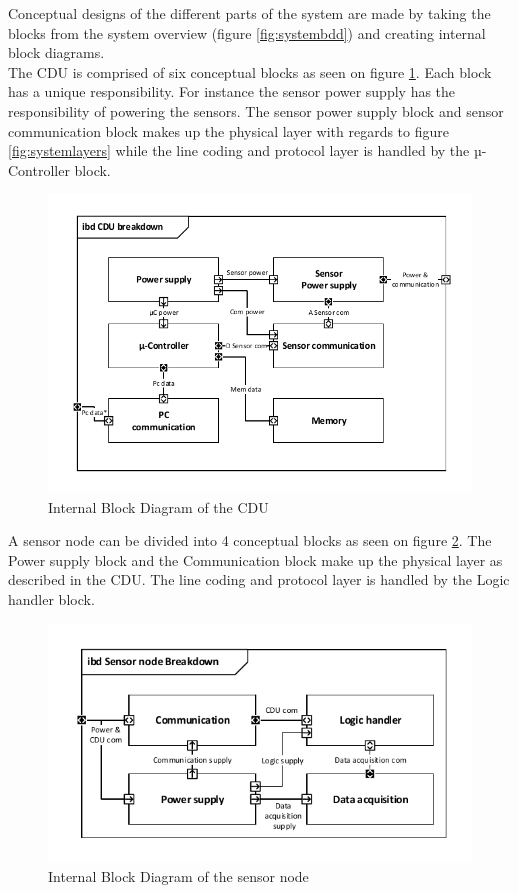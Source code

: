 Conceptual designs of the different parts of the system are made by taking the blocks from the system overview (figure \ref{fig:systembdd}) and creating internal block diagrams.\\
The CDU is comprised of six conceptual blocks as seen on figure \ref{CDU_IBD}. Each block has a unique responsibility. For instance the sensor power supply has the responsibility of powering the sensors. The sensor power supply block and sensor communication block makes up the physical layer with regards to figure \ref{fig:systemlayers} while the line coding and protocol layer is handled by the µ-Controller block. 
\begin{figure}[hbpt]
	\centering
	\includegraphics[width=.8\textwidth]{billeder/11ProjectDescription/CDU_IBD}
	\caption{Internal Block Diagram of the CDU}
	\label{CDU_IBD}
\end{figure}
A sensor node can be divided into 4 conceptual blocks as seen on figure \ref{fig:SN_IBD}. The Power supply block and the Communication block make up the physical layer as described in the CDU. The line coding and protocol layer is handled by the Logic handler block.
\begin{figure}[hbpt]
\centering
\includegraphics[width=.8\textwidth]{billeder/11ProjectDescription/Sensor_IBD}
\caption{Internal Block Diagram of the sensor node}
\label{fig:SN_IBD}
\end{figure}

